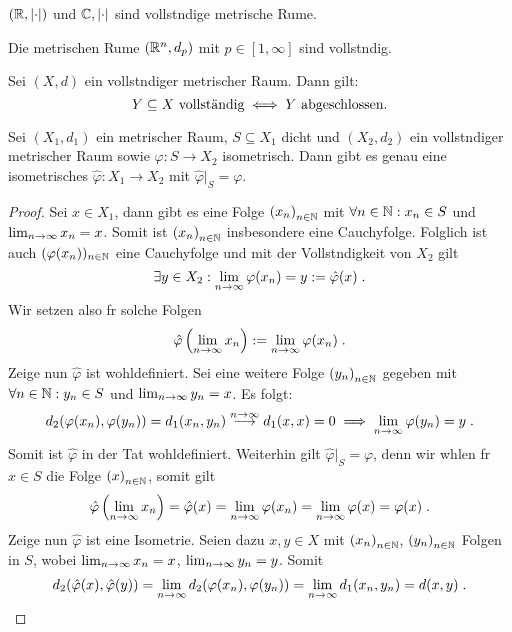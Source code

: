 \begin{ex}
	\((\mathbb{R}, \left\lvert \cdot \right\rvert)\) und \(\mathbb{C}, \left\lvert \cdot \right\rvert\) sind vollst\as ndige metrische R\as ume. 
\end{ex}

\begin{ex}
	Die metrischen R\as ume  \((\mathbb{R}^n, d_p)\) mit \(p \in [1, \infty]\) sind vollst\as ndig.
\end{ex}

\begin{theorem}
	Sei \((X, d)\) ein vollst\as ndiger metrischer Raum. Dann gilt: 
	\[ Y \subseteq X \text{ vollst{\"a}ndig} \iff Y \text{ abgeschlossen.}\]
\end{theorem}

\begin{theorem}
	Sei \((X_1,d_1)\) ein metrischer Raum, \(S\subseteq X_1\) dicht und \((X_2, d_2)\) ein vollst\as ndiger metrischer Raum sowie \(\varphi: S \to X_2\) isometrisch. Dann gibt es genau eine isometrisches \(\hat\varphi: X_1\to X_2\) mit \(\hat\varphi\vert_S = \varphi\).
	\label{vollst_isometrie}
\end{theorem}
\begin{proof}
	Sei \(x\in X_1\), dann gibt es eine Folge \(\left (x_n\right )_{n\in \mathbb{N}}\) mit \(\forall n \in \mathbb{N}: x_n \in S\) und \(\lim_{n \to \infty} x_n = x\). Somit ist \(\left (x_n\right )_{n\in \mathbb{N}}\) insbesondere eine Cauchyfolge. Folglich ist auch \((\varphi(x_n))_{n\in\mathbb{N}}\) eine Cauchyfolge und mit der Vollst\as ndigkeit von $X_2$ gilt
	\[\exists y\in X_2: \lim_{n \to\infty} \varphi(x_n) = y:= \hat\varphi(x)\;.\]
	Wir setzen also f\us r solche Folgen \[\hat\varphi\left(\lim_{n \to \infty} x_n\right) := \lim_{n \to\infty} \varphi(x_n)\;.\]
	Zeige nun \(\hat \varphi\) ist wohldefiniert. Sei eine weitere Folge \(\left (y_n\right )_{n\in \mathbb{N}}\) gegeben mit \(\forall n \in \mathbb{N}: y_n \in S\) und \(\lim_{n \to \infty} y_n = x\). Es folgt:
	\[d_2(\varphi(x_n), \varphi(y_n)) = d_1(x_n, y_n) \overset{n\to\infty}{\longrightarrow} d_1(x,x) = 0 \implies \lim_{n \to\infty} \varphi(y_n) = y\;.\]
	Somit ist $\hat\varphi$ in der Tat wohldefiniert. Weiterhin gilt \(\hat\varphi\vert_S = \varphi\), denn wir w\as hlen f\us r \(x \in S\) die Folge $\left (x\right )_{n\in \mathbb{N}}$, somit gilt
	\[ \hat \varphi\left(\lim_{n \to \infty} x_n \right) = \hat\varphi(x) = \lim_{n \to\infty} \varphi(x_n) = \lim_{n \to\infty} \varphi(x) = \varphi(x)\;.\] 
	Zeige nun \(\hat\varphi\) ist eine Isometrie. Seien dazu \(x,y\in X\) mit  $\left (x_n\right )_{n\in \mathbb{N}}$, $\left (y_n\right )_{n\in \mathbb{N}}$ Folgen in $S$, wobei $\lim_{n \to \infty} x_n = x$, $\lim_{n \to \infty} y_n = y$. Somit
	\[d_2(\hat\varphi(x), \hat\varphi(y)) = \lim_{n \to\infty} d_2(\varphi(x_n), \varphi(y_n)) = \lim_{n \to\infty} d_1(x_n, y_n) = d(x,y) \;.\] 
\end{proof}


